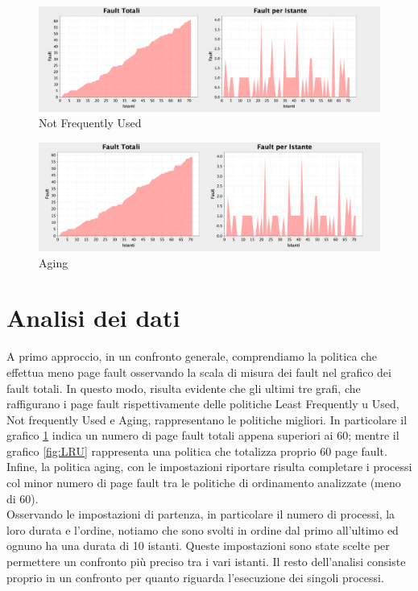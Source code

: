 \documentclass[12px]{article}
\begin{document}
\begin{figure}[!h]
	\centering
	\includegraphics[scale=0.3]{img/nfu}
	\caption{Not Frequently Used}
    \label{fig:NFU}
\end{figure}

\begin{figure}[!h]
	\centering
	\includegraphics[scale=0.3]{img/a}
	\caption{Aging}
    \label{fig:A}
\end{figure}
\newpage
\section{Analisi dei dati}
A primo approccio, in un confronto generale, comprendiamo la politica che effettua meno page fault osservando la scala di misura dei fault nel grafico dei fault totali. In questo modo, risulta evidente che gli ultimi tre grafi, che raffigurano i page fault rispettivamente delle politiche Least Frequently u
Used, Not frequently Used e Aging, rappresentano le politiche migliori. In particolare il grafico \ref{fig:NFU} indica un numero di page fault totali appena superiori ai 60; mentre il grafico \ref{fig:LRU} rappresenta una politica che totalizza proprio 60 page fault. Infine, la politica aging, con le impostazioni riportare risulta completare i processi col minor numero di page fault tra le politiche di ordinamento analizzate (meno di 60).\\

Osservando le impostazioni di partenza, in particolare il numero di processi, la loro durata e l'ordine, notiamo che sono svolti in ordine dal primo all'ultimo ed ognuno ha una durata di 10 istanti. Queste impostazioni sono state scelte per permettere un confronto più preciso tra i vari istanti. Il resto dell'analisi consiste proprio in un confronto per quanto riguarda l'esecuzione dei singoli processi. 
\end{document}
